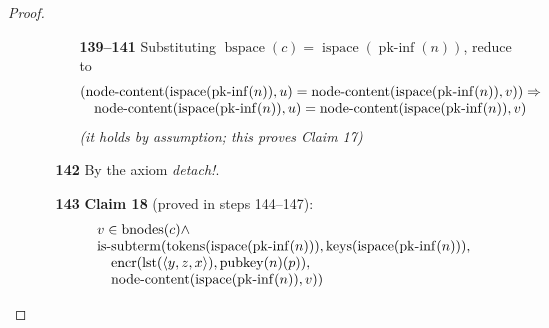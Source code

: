 \documentclass[11pt]{article}
\theoremstyle{plain}
\begin{document}
\begin{proof}
\begin{itemize}[leftmargin=2.8em, itemsep=4pt, parsep=1pt]
\begin{itemize}[leftmargin=2.8em, itemsep=4pt, parsep=1pt]
  \begin{itemize}[leftmargin=2.8em, itemsep=4pt, parsep=1pt]
  \item[\textbf{139--141}] Substituting $\operatorname{bspace}(c) = \operatorname{ispace}(\operatorname{pk\text{-}inf}(n))$, reduce to
\begin{equation*}
\begin{array}{@{}l@{}} (\operatorname{node\text{-}content}(\operatorname{ispace}(\operatorname{pk\text{-}inf}(n)), u) = \operatorname{node\text{-}content}(\operatorname{ispace}(\operatorname{pk\text{-}inf}(n)), v)) \Rightarrow  \\ \quad \operatorname{node\text{-}content}(\operatorname{ispace}(\operatorname{pk\text{-}inf}(n)), u) = \operatorname{node\text{-}content}(\operatorname{ispace}(\operatorname{pk\text{-}inf}(n)), v) \end{array}
\end{equation*}
  \emph{(it holds by assumption; this proves Claim 17)}
  \end{itemize}
  \item[\textbf{142}] By the axiom \emph{detach!}.
  \item[\textbf{143}] \textbf{Claim 18} (proved in steps 144--147):
\begin{equation*}
\begin{array}{@{}l@{}} v \in \operatorname{bnodes}(c) \wedge \\ \operatorname{is\text{-}subterm}(\operatorname{tokens}(\operatorname{ispace}(\operatorname{pk\text{-}inf}(n))), \operatorname{keys}(\operatorname{ispace}(\operatorname{pk\text{-}inf}(n))), \\ \quad \operatorname{encr}(\operatorname{lst}(\langle y, z, x \rangle), \operatorname{pubkey}(n)(p)), \\ \quad \operatorname{node\text{-}content}(\operatorname{ispace}(\operatorname{pk\text{-}inf}(n)), v)) \end{array}
\end{equation*}


\end{itemize}
\end{itemize}
\end{proof}
\end{document}
